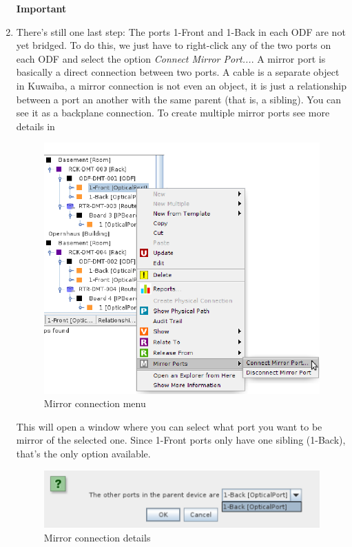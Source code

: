 \documentclass[a4paper]{article}
\begin{document}
\begin{enumerate}
\begin{framed} {\large \textbf{Important}}
					\end{framed}
					\item There's still one last step: The ports 1-Front and 1-Back in each ODF are not yet bridged. To do this, we just have to right-click any of the two ports on each ODF and select the option \textit{Connect Mirror Port...}. A mirror port is basically a direct connection between two ports. A cable is a separate object in Kuwaiba, a mirror connection is not even an object, it is just a relationship between a port an another with the same parent (that is, a sibling). You can see it as a backplane connection.
					To create multiple mirror ports see more details in \textbf{}
					\begin{figure}[h!]
						\centering
						\includegraphics[width=0.7\linewidth]{img/l1_example_2_mirror_connection_menu.png}
						\caption{Mirror connection menu}
						\label{fig:l1_example_2_mirror_connection_menu}
					\end{figure}
					\newpage
					This will open a window where you can select what port you want to be mirror of the selected one. Since 1-Front ports only have one sibling (1-Back), that's the only option available.
					\begin{figure}[h!]
						\centering
						\includegraphics[width=0.5\linewidth]{img/l1_example_2_mirror_connection_details.png}
						\caption{Mirror connection details}
						\label{fig:l1_example_2_mirror_connection_details}
					\end{figure}
					

\end{enumerate}
\end{document}
